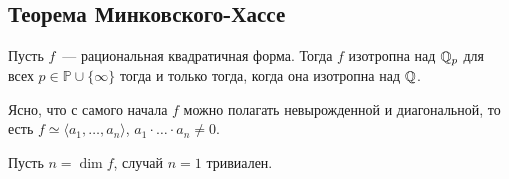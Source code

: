 
	\subsection{Теорема Минковского-Хассе}

	\begin{theorem}\label{MinkHasse} 
		Пусть $f$~--- рациональная квадратичная форма. Тогда $f$ изотропна над $\mathbb{Q}_{p}$ для всех  $p \in \mathbb{P} \cup \{ \infty \}$ тогда и только тогда, когда она изотропна над $\mathbb{Q}$.
	\end{theorem}

	\begin{remark}
		Ясно, что с самого начала $f$ можно полагать невырожденной и диагональной, то есть $f \simeq \langle a_1, \ldots, a_n \rangle$, $a_1 \cdot \ldots \cdot a_n \neq 0$.
	\end{remark}

	Пусть $n = \dim{f}$, случай $n = 1$ тривиален. 

